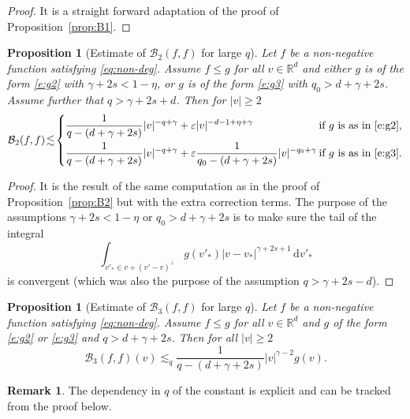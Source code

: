 \documentclass[JEP,XML,SOM,Unicode,NoFloatCountersInSection]{cedram}
\theoremstyle{plain}
\newtheorem{prop}[thm]{Proposition}
\theoremstyle{definition}
\newtheorem{remark}[thm]{Remark}
\numberwithin{equation}{section}
\newcommand{\R}{\mathbb R}
\newcommand{\eps}{\varepsilon}
\newcommand{\dd} {\, \mathrm{d}}
\begin{document}
\begin{proof} It is a straight forward adaptation of the proof of Proposition~\ref{prop:B1}.
\end{proof}

\begin{prop}[Estimate of {$\mathcal{B}_2(f,f)$} for large
$q$] \label{prop:B2-2} Let $f$ be a non-negative function satisfying \eqref{eq:non-deg}. Assume $f \leq g$ for all $v \in \R^d$ and
either $g$ is of the form \eqref{e:g2} with $\gamma+2s < 1-\eta$, or
$g$ is of the form \eqref{e:g3} with $q_0 > d+\gamma+2s$. Assume
further that $q> \gamma +2s +d$. Then for $|v| \ge 2$
\[
\mathcal{B}_2 (f,f) \!\lesssim\! \begin{cases}\displaystyle
\frac 1 {q-(d+\gamma + 2s)} |v|^{-q+\gamma} + \eps
|v|^{-d-1+\eta +\gamma}
& \hspace*{-8pt}\text{if $g$ is as in \eqref{e:g2}}, \\[3mm] \displaystyle
\frac 1 {q-(d+\gamma + 2s)} |v|^{-q+\gamma} + \eps \frac 1
{q_0-(d+\gamma + 2s)} |v|^{-q_0 +\gamma}
& \hspace*{-8pt}\text{if $g$ is as
in \eqref{e:g3}}.
\end{cases}
\]
\end{prop}

\begin{proof}
It is the result of the same computation as in the proof of
Proposition~\ref{prop:B2} but with the extra correction terms. The
purpose of the assumptions $\gamma+2s < 1-\eta$ or
$q_0 > d+\gamma+2s$ is to make sure the tail of the integral
\[ \int_{v'_* \in v + (v'-v)^\bot} g(v'_*) |v-v_*|^{\gamma+2s +1}
\dd v'_*\] is convergent (which was also the purpose of the
assumption $q > \gamma+2s-d$).
\end{proof}

\begin{prop}[Estimate of {$\mathcal{B}_3(f,f)$} for large
$q$] \label{prop:B3-2} Let $f$ be a non-negative function satisfying \eqref{eq:non-deg}. Assume $f \leq g$ for all $v \in \R^d$ and
$g$ of the form \eqref{e:g2} or \eqref{e:g3} and $q> d+\gamma
+2s$. Then for all $|v| \ge 2$
\[ \mathcal{B}_3 (f,f)(v) \lesssim_q \frac{1}{q-(d+\gamma+2s)} |v|^{\gamma -2} g(v).\]
\end{prop}
\begin{remark}
The dependency in $q$ of the constant is explicit and can be
tracked from the proof below.
\end{remark}
\end{document}
